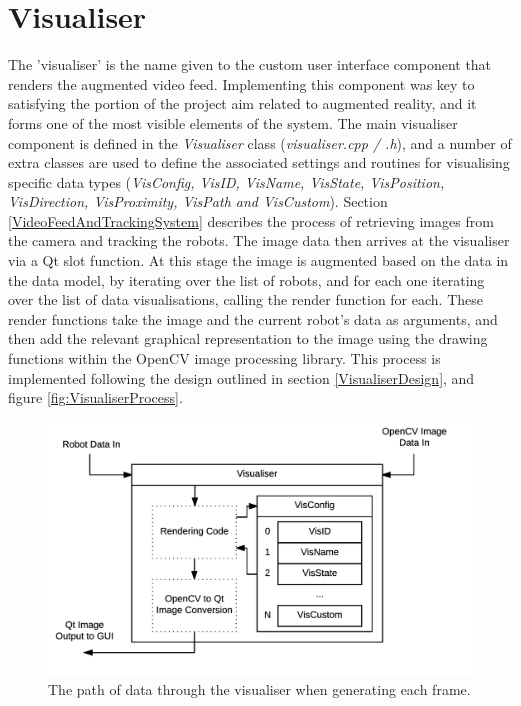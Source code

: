 
\section{Visualiser} \label{VisualiserImplementation}
The 'visualiser' is the name given to the custom user interface component that renders the augmented video feed. Implementing this component was key to satisfying the portion of the project aim related to augmented reality, and it forms one of the most visible elements of the system. The main visualiser component is defined in the \textit{Visualiser} class (\textit{visualiser.cpp / .h}), and a number of extra classes are used to define the associated settings and routines for visualising specific data types (\textit{VisConfig, VisID, VisName, VisState, VisPosition, VisDirection, VisProximity, VisPath and VisCustom}). Section \ref{VideoFeedAndTrackingSystem} describes the process of retrieving images from the camera and tracking the robots. The image data then arrives at the visualiser via a Qt slot function. At this stage the image is augmented based on the data in the data model, by iterating over the list of robots, and for each one iterating over the list of data visualisations, calling the render function for each. These render functions take the image and the current robot's data as arguments, and then add the relevant graphical representation to the image using the drawing functions within the OpenCV image processing library. This process is implemented following the design outlined in section \ref{VisualiserDesign}, and figure \ref{fig:VisualiserProcess}. 

\begin{figure}
	\centering
	\includegraphics[scale=1]{Figures/VisualiserDiagram.png}
	\decoRule
	\caption[Visualiser Data Flow]{The path of data through the visualiser when generating each frame.}
	\label{fig:VisualiserDiagram}
\end{figure}

